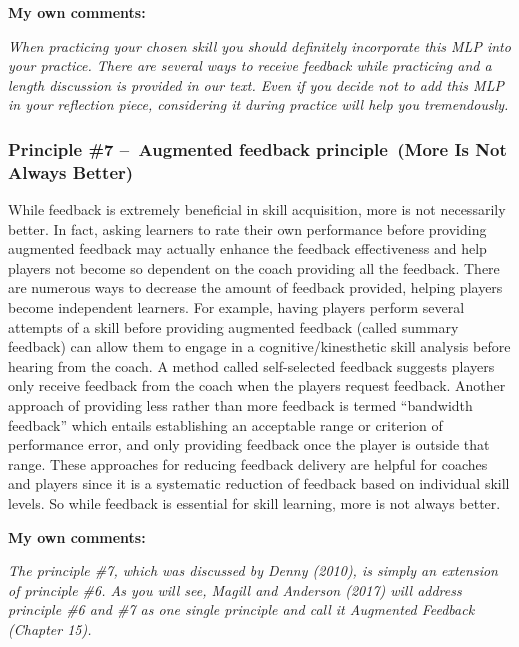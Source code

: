\documentclass[
  letterpaper,
  DIV=11,
  numbers=noendperiod]{scrartcl}
\begin{document}
\textbf{My own comments:}

\emph{When practicing your chosen skill you should definitely
incorporate this MLP into your practice. There are several ways to
receive feedback while practicing and a length discussion is provided in
our text. Even if you decide not to add this MLP in your reflection
piece, considering it during practice will help you tremendously.}

\hypertarget{principle-7-augmented-feedback-principle-more-is-not-always-better}{%
\subsubsection{\texorpdfstring{\textbf{Principle \#7 --~Augmented
feedback principle~(More Is Not Always
Better)}}{Principle \#7 --~Augmented feedback principle~(More Is Not Always Better)}}\label{principle-7-augmented-feedback-principle-more-is-not-always-better}}

While feedback is extremely beneficial in skill acquisition, more is not
necessarily better. In fact, asking learners to rate their own
performance before providing augmented feedback may actually enhance the
feedback effectiveness and help players not become so dependent on the
coach providing all the feedback. There are numerous ways to decrease
the amount of feedback provided, helping players become independent
learners. For example, having players perform several attempts of a
skill before providing augmented feedback (called summary feedback) can
allow them to engage in a cognitive/kinesthetic skill analysis before
hearing from the coach. A method called self-selected feedback suggests
players only receive feedback from the coach when the players request
feedback. Another approach of providing less rather than more feedback
is termed ``bandwidth feedback'' which entails establishing an
acceptable range or criterion of performance error, and only providing
feedback once the player is outside that range. These approaches for
reducing feedback delivery are helpful for coaches and players since it
is a systematic reduction of feedback based on individual skill levels.
So while feedback is essential for skill learning, more is not always
better.

\textbf{My own comments:}

\emph{The principle \#7, which was discussed by Denny (2010), is simply
an extension of principle \#6. As you will see, Magill and Anderson
(2017) will address principle \#6 and \#7 as one single principle and
call it Augmented Feedback (Chapter 15).}
\end{document}
